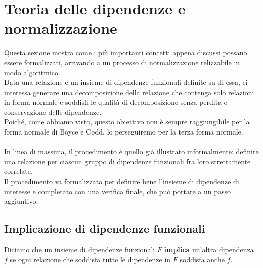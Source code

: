 \section{Teoria delle dipendenze e normalizzazione}
Questa sezione mostra come i più importanti concetti appena discussi possano essere formalizzati, arrivando a un processo di normalizzazione relizzabile in modo algoritmico.\\
Data una relazione e un insieme di dipendenze funzionali definite su di essa, ci interessa generare una decomposizione della relazione che contenga solo relazioni in forma normale e soddisfi le qualità di decomposizione senza perdita e conservazione delle dipendenze.\\
Poiché, come abbiamo visto, questo obiettivo non è sempre raggiungibile per la forma normale di Boyce e Codd, lo perseguiremo per la terza forma normale.\\\\
In linea di massima, il procedimento è quello già illustrato informalmente: definire una relazione per ciascun gruppo di dipendenze funzionali fra loro strettamente correlate.\\
Il procedimento va formalizzato per definire bene l'insieme di dipendenze di interesse e completato con una verifica finale, che può portare a un passo aggiuntivo.

\subsection{Implicazione di dipendenze funzionali}
Diciamo che un insieme di dipendenze funzionali $F$ \textbf{implica} un'altra dipendenza $f$ se ogni relazione che soddisfa tutte le dipendenze in $F$ soddisfa anche $f$.
